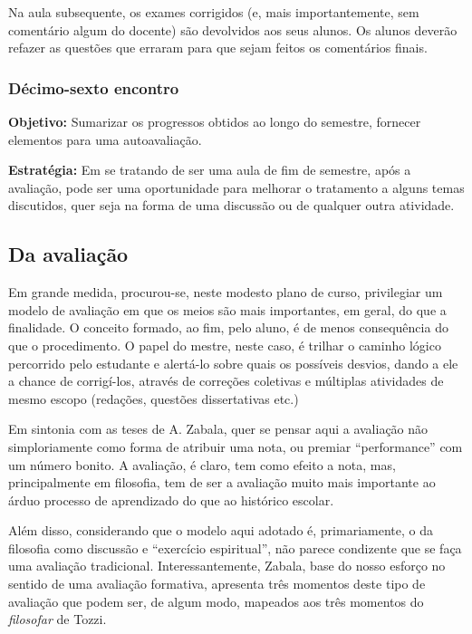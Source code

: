 \documentclass[12pt,a4paper]{article}
\newenvironment{citac}{
	\begin{addmargin}[4cm]{1em} \footnotesize}{\normalfont \end{addmargin}
}
\begin{document}
\begin{citac}
	Na aula subsequente, os exames corrigidos (e, mais importantemente,  
	sem comentário algum do docente) são devolvidos aos seus alunos. Os 
	alunos deverão refazer as questões que erraram para que sejam 
	feitos os comentários finais. 
	
	\subsubsection{Décimo-sexto encontro}
	
	\textbf{Objetivo:} Sumarizar os progressos obtidos ao longo do 
	semestre, fornecer elementos para uma autoavaliação. 

	\textbf{Estratégia:}
	Em se tratando de ser uma aula de fim de semestre, após a avaliação, 
	pode ser uma oportunidade para melhorar o tratamento a alguns temas 
	discutidos, quer seja na forma de uma discussão ou de qualquer outra 
	atividade. 



	\newpage
	
	\subsection{Da avaliação}

	Em grande medida, procurou-se, neste modesto plano de curso, 
	privilegiar um modelo de avaliação em que os meios são mais 
	importantes, em geral, do que a finalidade. O conceito formado, 
	ao fim, pelo aluno, é de menos consequência do que o procedimento. 
	O papel do mestre, neste caso, é trilhar o caminho lógico percorrido 
	pelo estudante e alertá-lo sobre quais os possíveis desvios, dando 
	a ele a chance de corrigí-los, através de correções coletivas e 
	múltiplas atividades de mesmo escopo (redações, questões dissertativas
	etc.) 

	Em sintonia com as teses de A. Zabala, quer se pensar aqui a 
	avaliação não simploriamente como forma de atribuir uma nota, ou 
	premiar “performance” com um número bonito. A avaliação, é claro, 
	tem como efeito a nota, mas, principalmente em filosofia, tem 
	de ser a avaliação muito mais importante ao árduo processo de 
	aprendizado do que ao histórico escolar. 

	Além disso, considerando que o modelo aqui adotado é, primariamente, 
	o da filosofia como discussão e “exercício espiritual”, não parece 
	condizente que se faça uma avaliação tradicional. Interessantemente, 
	Zabala, base do nosso esforço no sentido de uma avaliação formativa, 
	apresenta três momentos deste tipo de avaliação que podem ser, de 
	algum modo, mapeados aos três momentos do \emph{filosofar} de Tozzi. 


\end{citac}
\end{document}
